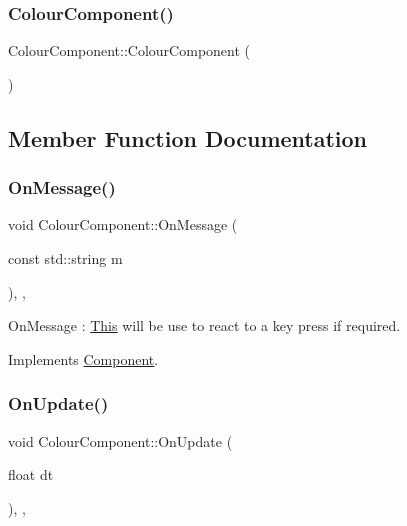 \subsubsection{\texorpdfstring{Colour\+Component()}{ColourComponent()}}
{\footnotesize\ttfamily Colour\+Component\+::\+Colour\+Component (\begin{DoxyParamCaption}{ }\end{DoxyParamCaption})\hspace{0.3cm}{\ttfamily [inline]}}



\subsection{Member Function Documentation}
\mbox{\label{class_colour_component_a40b859f0c124ddbe92ff1e53bdb398a0}} 
\subsubsection{\texorpdfstring{On\+Message()}{OnMessage()}}
{\footnotesize\ttfamily void Colour\+Component\+::\+On\+Message (\begin{DoxyParamCaption}\item[{const std\+::string}]{m }\end{DoxyParamCaption})\hspace{0.3cm}{\ttfamily [inline]}, {\ttfamily [override]}, {\ttfamily [virtual]}}

On\+Message \+: \mbox{\hyperlink{class_this}{This}} will be use to react to a key press if required. 

Implements \mbox{\hyperlink{class_component_a1a880fe5e212cd7ef8241e220660417d}{Component}}.

\mbox{\label{class_colour_component_ae45e91aebb680031bb1328c7c189ea15}} 
\subsubsection{\texorpdfstring{On\+Update()}{OnUpdate()}}
{\footnotesize\ttfamily void Colour\+Component\+::\+On\+Update (\begin{DoxyParamCaption}\item[{float}]{dt }\end{DoxyParamCaption})\hspace{0.3cm}{\ttfamily [inline]}, {\ttfamily [override]}, {\ttfamily [virtual]}}

